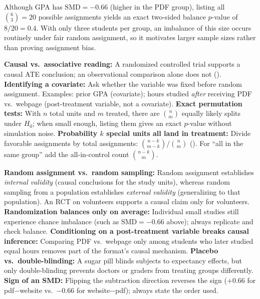 \documentclass[10pt]{scrartcl}
\begin{document}
\revisit Although GPA has $\mathrm{SMD} = -0.66$ (higher in the PDF group), listing all $\binom{6}{3}=20$ possible assignments yields an exact two-sided balance $p$-value of $8/20 = 0.4$. With only three students per group, an imbalance of this size occurs routinely under fair random assignment, so it motivates larger sample sizes rather than proving assignment bias.

\begin{shortcuts}
  \ii \textbf{Causal vs.\ associative reading:} A randomized controlled trial supports a causal ATE conclusion; an observational comparison alone does not ().
  \ii \textbf{Identifying a covariate:} Ask whether the variable was fixed before random assignment. Examples: prior GPA (covariate); hours studied \emph{after} receiving PDF vs.\ webpage (post-treatment variable, not a covariate).
  \ii \textbf{Exact permutation tests:} With $n$ total units and $m$ treated, there are $\binom{n}{m}$ equally likely splits under $H_0$; when small enough, listing them gives an exact $p$-value without simulation noise.
  \ii \textbf{Probability $k$ special units all land in treatment:} Divide favorable assignments by total assignments: $\binom{n-k}{m-k}/\binom{n}{m}$ (). For ``all in the same group'' add the all-in-control count $\binom{n-k}{m}$.
\end{shortcuts}

\begin{trapbox}
  \ii \textbf{Random assignment vs.\ random sampling:} Random assignment establishes \emph{internal validity} (causal conclusions for the study units), whereas random sampling from a population establishes \emph{external validity} (generalizing to that population). An RCT on volunteers supports a causal claim only for volunteers.
  \ii \textbf{Randomization balances only on average:} Individual small studies still experience chance imbalance (such as $\mathrm{SMD} = -0.66$ above); always replicate and check balance.
  \ii \textbf{Conditioning on a post-treatment variable breaks causal inference:} Comparing PDF vs.\ webpage only among students who later studied equal hours removes part of the format's causal mechanism.
  \ii \textbf{Placebo vs.\ double-blinding:} A sugar pill blinds subjects to expectancy effects, but only double-blinding prevents doctors or graders from treating groups differently.
  \ii \textbf{Sign of an SMD:} Flipping the subtraction direction reverses the sign ($+0.66$ for pdf$-$website vs.\ $-0.66$ for website$-$pdf); always state the order used.
\end{trapbox}
\end{document}
